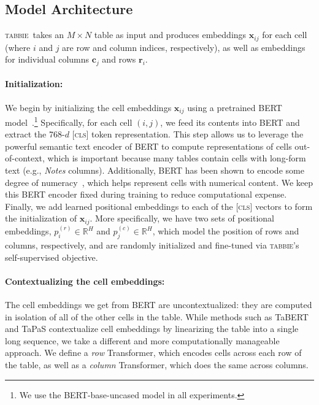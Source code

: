 \documentclass[11pt]{article}
\newcommand{\bvec}[1]{\boldsymbol{#1}}
\newcommand{\name}[0]{\textsc{tabbie}}
\begin{document}
\newcommand*{\Scale}[2][4]{\scalebox{#1}{$#2$}}

\subsection{Model Architecture} 

\name\ takes an $M \times N$ table as input and produces  embeddings $\bvec{x}_{ij}$ for each cell (where $i$ and $j$ are row and column indices, respectively), as well as embeddings for individual columns $\bvec{c}_{j}$ and rows $\bvec{r}_{i}$. 

\paragraph{Initialization:} We begin by initializing the cell embeddings $\bvec{x}_{ij}$ using a pretrained BERT model~\citep{devlin2018bert}.\footnote{We use the BERT-base-uncased model in all experiments.} Specifically, for each cell $(i, j)$, we feed its contents into BERT and extract the 768-$d$ \textsc{[cls]} token representation. This step allows us to leverage the powerful semantic text encoder of BERT to compute representations of cells out-of-context, which is important because many tables contain cells with long-form text (e.g., \emph{Notes} columns). Additionally, BERT has been shown to encode some degree of numeracy~\citep{Wallace2019Numeracy}, which helps represent cells with numerical content. We keep this BERT encoder fixed during training to reduce computational expense. Finally, we add learned positional embeddings to each of the \textsc{[cls]} vectors to form the initialization of $\bvec{x}_{ij}$. More specifically, we have two sets of positional embeddings, $p^{(r)}_i \in \mathbb{R}^H$ and $p^{(c)}_j \in \mathbb{R}^H$, which model the position of rows and columns, respectively, and are randomly initialized and fine-tuned via \name's self-supervised objective.

\paragraph{Contextualizing the cell embeddings:}
The cell embeddings we get from BERT are uncontextualized: they are computed in isolation of all of the other cells in the table. While methods such as TaBERT and TaPaS contextualize cell embeddings by linearizing the table into a single long sequence, we take a different and more computationally manageable approach. We define a \emph{row} Transformer, which encodes cells across each row of the table, as well as a \emph{column} Transformer, which does the same across columns. 
\end{document}
